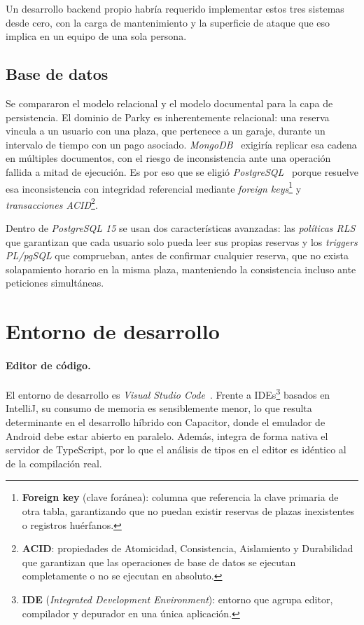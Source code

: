 Un desarrollo backend propio habría requerido implementar estos tres sistemas desde cero, con la carga de mantenimiento y la superficie de ataque que eso implica en un equipo de una sola persona.

\subsection{Base de datos}
\label{subsec:bbdd}

Se compararon el modelo relacional y el modelo documental para la capa de persistencia. El dominio de Parky es inherentemente relacional: una reserva vincula a un usuario con una plaza, que pertenece a un garaje, durante un intervalo de tiempo con un pago asociado. \textit{MongoDB}~\cite{mongodb2024} exigiría replicar esa cadena en múltiples documentos, con el riesgo de inconsistencia ante una operación fallida a mitad de ejecución. Es por eso que se eligió \textit{PostgreSQL}~\cite{postgresql2024} porque resuelve esa inconsistencia con integridad referencial mediante \textit{foreign keys}\footnote{\textbf{Foreign key} (clave foránea): columna que referencia la clave primaria de otra tabla, garantizando que no puedan existir reservas de plazas inexistentes o registros huérfanos.} y \textit{transacciones ACID}\footnote{\textbf{ACID}: propiedades de Atomicidad, Consistencia, Aislamiento y Durabilidad que garantizan que las operaciones de base de datos se ejecutan completamente o no se ejecutan en absoluto.}.

Dentro de \textit{PostgreSQL 15} se usan dos características avanzadas: las \textit{políticas RLS} que garantizan que cada usuario solo pueda leer sus propias reservas y los \textit{triggers PL/pgSQL} que comprueban, antes de confirmar cualquier reserva, que no exista solapamiento horario en la misma plaza, manteniendo la consistencia incluso ante peticiones simultáneas.

\section{Entorno de desarrollo}
\label{sec:entorno}

\paragraph{Editor de código.}
El entorno de desarrollo es \textit{Visual Studio Code}~\cite{vscode2026}. Frente a IDEs\footnote{\textbf{IDE} (\textit{Integrated Development Environment}): entorno que agrupa editor, compilador y depurador en una única aplicación.} basados en IntelliJ, su consumo de memoria es sensiblemente menor, lo que resulta determinante en el desarrollo híbrido con Capacitor, donde el emulador de Android debe estar abierto en paralelo. Además, integra de forma nativa el servidor de TypeScript, por lo que el análisis de tipos en el editor es idéntico al de la compilación real.

